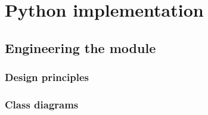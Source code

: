 
\chapter{Python implementation}


\section{Engineering the module}
\subsection{Design principles}
\subsection{Class diagrams}

